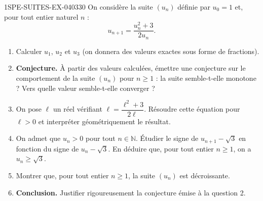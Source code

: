 \begin{exercice}{1SPE-SUITES-EX-040}{3}{30}
On considère la suite $(u_n)$ définie par $u_0 = 1$ et, pour tout entier naturel $n$ :
\[
  u_{n+1} = \frac{u_n^2 + 3}{2u_n}.
\]

\begin{enumerate}
  \item Calculer $u_1$, $u_2$ et $u_3$ (on donnera des valeurs exactes sous forme de fractions).

  \item \textbf{Conjecture.} À partir des valeurs calculées, émettre une conjecture sur le comportement de la suite $(u_n)$ pour $n \geq 1$ : la suite semble-t-elle monotone ? Vers quelle valeur semble-t-elle converger ?

  \item On pose $\ell$ un réel vérifiant $\ell = \dfrac{\ell^2 + 3}{2\ell}$. Résoudre cette équation pour $\ell > 0$ et interpréter géométriquement le résultat.

  \item On admet que $u_n > 0$ pour tout $n \in \mathbb{N}$. Étudier le signe de $u_{n+1} - \sqrt{3}$ en fonction du signe de $u_n - \sqrt{3}$. En déduire que, pour tout entier $n \geq 1$, on a $u_n \geq \sqrt{3}$.

  \item Montrer que, pour tout entier $n \geq 1$, la suite $(u_n)$ est décroissante.

  \item \textbf{Conclusion.} Justifier rigoureusement la conjecture émise à la question 2.
\end{enumerate}
\end{exercice}
